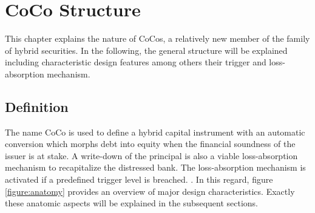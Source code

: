 \chapter{CoCo Structure}

This chapter explains the nature of CoCos, a relatively new member of the family of hybrid securities. In the following, the general structure will be explained including characteristic design features among others their trigger and loss-absorption mechanism.

\section{Definition}\label{definitioncocos}

The name CoCo is used to define a hybrid capital instrument with an automatic conversion which morphs debt into equity when the financial soundness of the issuer is at stake. A write-down of the principal is also a viable loss-absorption mechanism to recapitalize the distressed bank. The loss-absorption mechanism is activated if a predefined trigger level is breached. \citep{de2011pricing, zahres2011contingent}. In this regard, figure \ref{figure:anatomy} provides an overview of major design characteristics. Exactly  these anatomic aspects will be explained in the subsequent sections.\\

